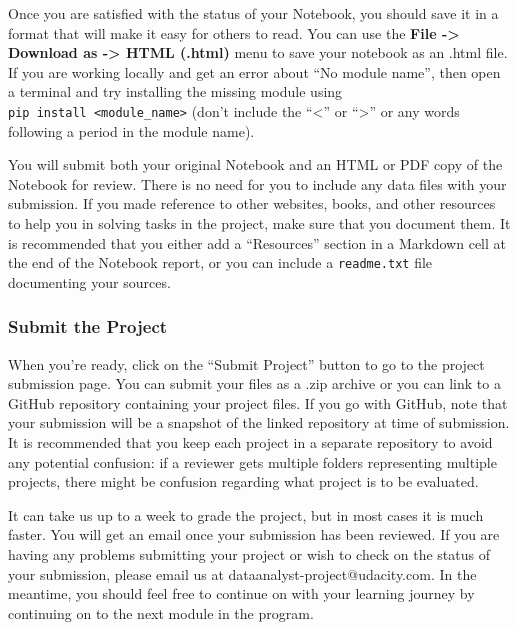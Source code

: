 \documentclass[11pt]{article}
\begin{document}
Once you are satisfied with the status of your Notebook, you should save
it in a format that will make it easy for others to read. You can use
the \textbf{File -\textgreater{} Download as -\textgreater{} HTML
(.html)} menu to save your notebook as an .html file. If you are working
locally and get an error about ``No module name'', then open a terminal
and try installing the missing module using
\texttt{pip\ install\ \textless{}module\_name\textgreater{}} (don't
include the ``\textless{}'' or ``\textgreater{}'' or any words following
a period in the module name).

You will submit both your original Notebook and an HTML or PDF copy of
the Notebook for review. There is no need for you to include any data
files with your submission. If you made reference to other websites,
books, and other resources to help you in solving tasks in the project,
make sure that you document them. It is recommended that you either add
a ``Resources'' section in a Markdown cell at the end of the Notebook
report, or you can include a \texttt{readme.txt} file documenting your
sources.

\hypertarget{submit-the-project}{%
\subsubsection{Submit the Project}\label{submit-the-project}}

When you're ready, click on the ``Submit Project'' button to go to the
project submission page. You can submit your files as a .zip archive or
you can link to a GitHub repository containing your project files. If
you go with GitHub, note that your submission will be a snapshot of the
linked repository at time of submission. It is recommended that you keep
each project in a separate repository to avoid any potential confusion:
if a reviewer gets multiple folders representing multiple projects,
there might be confusion regarding what project is to be evaluated.

It can take us up to a week to grade the project, but in most cases it
is much faster. You will get an email once your submission has been
reviewed. If you are having any problems submitting your project or wish
to check on the status of your submission, please email us at
dataanalyst-project@udacity.com. In the meantime, you should feel free
to continue on with your learning journey by continuing on to the next
module in the program.


    
    
    
    
\end{document}
